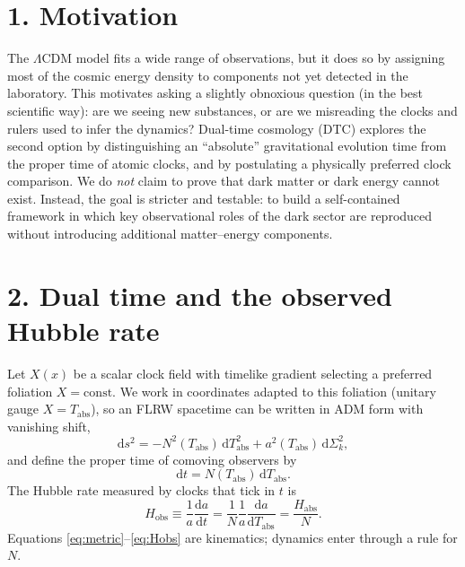 \documentclass[12pt]{article}
\newcommand{\Tabs}{T_{\mathrm{abs}}}
\newcommand{\Habs}{H_{\mathrm{abs}}}
\newcommand{\Hobs}{H_{\mathrm{obs}}}
\newcommand{\dd}{\mathrm{d}}
\begin{document}
\section*{1. Motivation}
The $\Lambda$CDM model fits a wide range of observations, but it does so by assigning most of the cosmic energy density to components not yet detected in the laboratory. This motivates asking a slightly obnoxious question (in the best scientific way): are we seeing new substances, or are we misreading the clocks and rulers used to infer the dynamics? Dual-time cosmology (DTC) explores the second option by distinguishing an ``absolute'' gravitational evolution time from the proper time of atomic clocks, and by postulating a physically preferred clock comparison. We do \emph{not} claim to prove that dark matter or dark energy cannot exist. Instead, the goal is stricter and testable: to build a self-contained framework in which key observational roles of the dark sector are reproduced without introducing additional matter--energy components.



\section*{2. Dual time and the observed Hubble rate}
Let $X(x)$ be a scalar clock field with timelike gradient selecting a preferred foliation $X=\mathrm{const}$. We work in coordinates adapted to this foliation (unitary gauge $X=\Tabs$), so an FLRW spacetime can be written in ADM form with vanishing shift,
\begin{equation}
\dd s^{2}=-N^{2}(\Tabs)\,\dd \Tabs^{2}+a^{2}(\Tabs)\,\dd\Sigma_{k}^{2},
\label{eq:metric}
\end{equation}
and define the proper time of comoving observers by
\begin{equation}
\dd t = N(\Tabs)\,\dd \Tabs.
\label{eq:dt}
\end{equation}
The Hubble rate measured by clocks that tick in $t$ is
\begin{equation}
\Hobs \equiv \frac{1}{a}\frac{\dd a}{\dd t}=\frac{1}{N}\frac{1}{a}\frac{\dd a}{\dd \Tabs}=\frac{\Habs}{N}.
\label{eq:Hobs}
\end{equation}
Equations \eqref{eq:metric}--\eqref{eq:Hobs} are kinematics; dynamics enter through a rule for $N$.
\end{document}
